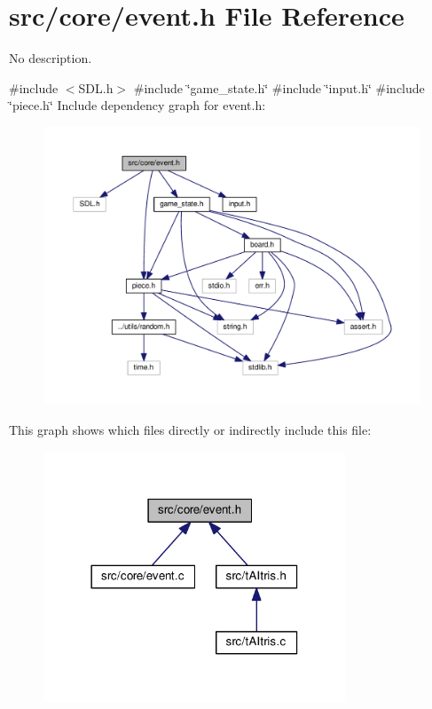 \section{src/core/event.h File Reference}
\label{event_8h}


No description.  


{\ttfamily \#include $<$S\+D\+L.\+h$>$}\newline
{\ttfamily \#include \char`\"{}game\+\_\+state.\+h\char`\"{}}\newline
{\ttfamily \#include \char`\"{}input.\+h\char`\"{}}\newline
{\ttfamily \#include \char`\"{}piece.\+h\char`\"{}}\newline
Include dependency graph for event.\+h\+:
\nopagebreak
\begin{figure}[H]
\begin{center}
\leavevmode
\includegraphics[width=350pt]{event_8h__incl}
\end{center}
\end{figure}
This graph shows which files directly or indirectly include this file\+:
\nopagebreak
\begin{figure}[H]
\begin{center}
\leavevmode
\includegraphics[width=254pt]{event_8h__dep__incl}
\end{center}
\end{figure}
